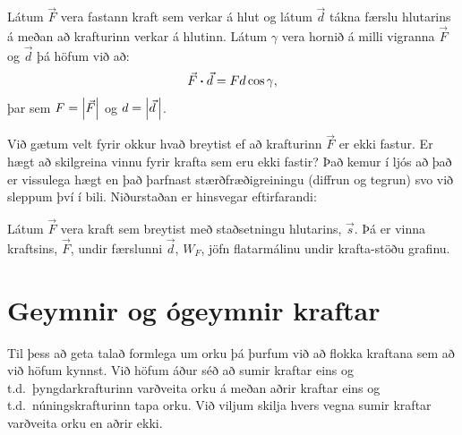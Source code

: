 \ifdefined \wholebook \else\documentclass[oneside]{book}\usepackage{EdlBook}\graphicspath{{figures/}}
\begin{document}
\begin{tcolorbox}
\begin{theorem}
Látum $\vec{F}$ vera fastann kraft sem verkar á hlut og látum $\vec{d}$ tákna færslu hlutarins á meðan að krafturinn verkar á hlutinn. Látum $\gamma$ vera hornið á milli vigranna $\vec{F}$ og $\vec{d}$ þá höfum við að:
\begin{align*}
    \vec{F} \vdot \vec{d} = F d \cos\gamma,
\end{align*}
þar sem $F = \abs{\vec{F}}$ og $d = \abs{\vec{d}\,}$. 
\end{theorem}
\end{tcolorbox}

Við gætum velt fyrir okkur hvað breytist ef að krafturinn $\vec{F}$ er ekki fastur. Er hægt að skilgreina vinnu fyrir krafta sem eru ekki fastir? Það kemur í ljós að það er vissulega hægt en það þarfnast stærðfræðigreiningu (diffrun og tegrun) svo við sleppum því í bili. Niðurstaðan er hinsvegar eftirfarandi:

\begin{tcolorbox}
\begin{theorem} \label{theorem:flatarmalWork}
Látum $\Vec{F}$ vera kraft sem breytist með staðsetningu hlutarins, $\vec{s}$. Þá er vinna kraftsins, $\vec{F}$, undir færslunni $\vec{d}$, $W_F$, jöfn flatarmálinu undir krafta-stöðu grafinu.
\end{theorem}
\end{tcolorbox}

\section{Geymnir og ógeymnir kraftar}

Til þess að geta talað formlega um orku þá þurfum við að flokka kraftana sem að við höfum kynnst. Við höfum áður séð að sumir kraftar eins og t.d.~þyngdarkrafturinn varðveita orku á meðan aðrir kraftar eins og t.d.~núningskrafturinn tapa orku. Við viljum skilja hvers vegna sumir kraftar varðveita orku en aðrir ekki.
\end{document}
